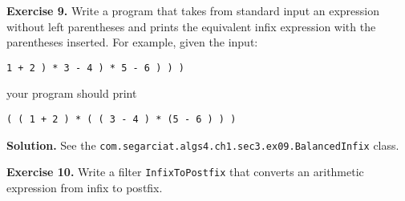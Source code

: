 \documentclass[12pt, a4paper]{article}
\newenvironment{ex}[2][Exercise]
{\par\medskip\noindent \textbf{#1 #2.}}
{\medskip}
\newenvironment{sol}[1][Solution]
{\par\medskip\noindent \textbf{#1.} }
{\medskip}
\begin{document}
	\begin{ex}{9}
		Write a program that takes from standard input an expression without left parentheses
		and prints the equivalent infix expression with the parentheses inserted. For example,
		given the input:
		\begin{lstlisting}[language={}]
		1 + 2 ) * 3 - 4 ) * 5 - 6 ) ) )
		\end{lstlisting}
		your program should print
		\begin{lstlisting}[language={}]
		( ( 1 + 2 ) * ( ( 3 - 4 ) * (5 - 6 ) ) )
		\end{lstlisting}
	\end{ex}
	\begin{sol}
		See the \texttt{com.segarciat.algs4.ch1.sec3.ex09.BalancedInfix} class.
	\end{sol}
	\begin{ex}{10}
		Write a filter \texttt{InfixToPostfix} that converts an arithmetic expression
		from infix to postfix.
	\end{ex}
	\pagebreak
	\printbibliography
\end{document}
